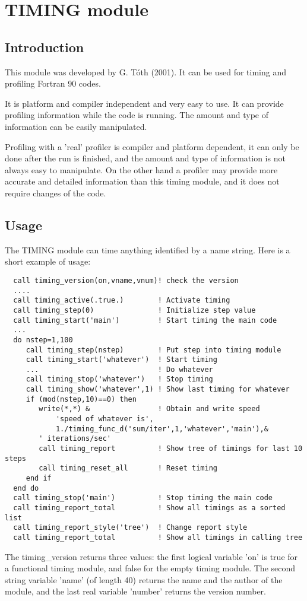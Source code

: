 \documentclass[10pt]{article}
\begin{document}
\section{TIMING module}

\subsection{Introduction}

This module was developed by G. T\'oth (2001).
It can be used for timing and profiling Fortran 90 codes.

It is platform and compiler independent and very easy to use.
It can provide profiling information while the code is running.
The amount and type of information can be easily manipulated.

Profiling with a 'real' profiler is compiler and platform dependent, 
it can only be done after the run is finished, and the amount and
type of information is not always easy to manipulate. On the other hand
a profiler may provide more accurate and detailed information than 
this timing module, and it does not require changes of the code.

\subsection{Usage}

The TIMING module can time anything identified by a name string.
Here is a short example of usage:
{\footnotesize
\begin{verbatim}
  call timing_version(on,vname,vnum)! check the version
  ....
  call timing_active(.true.)        ! Activate timing
  call timing_step(0)               ! Initialize step value
  call timing_start('main')         ! Start timing the main code
  ...
  do nstep=1,100
     call timing_step(nstep)        ! Put step into timing module
     call timing_start('whatever')  ! Start timing
     ...                            ! Do whatever
     call timing_stop('whatever')   ! Stop timing
     call timing_show('whatever',1) ! Show last timing for whatever 
     if (mod(nstep,10)==0) then
        write(*,*) &                ! Obtain and write speed
            'speed of whatever is',
            1./timing_func_d('sum/iter',1,'whatever','main'),&
	    ' iterations/sec'
        call timing_report          ! Show tree of timings for last 10 steps
        call timing_reset_all       ! Reset timing
     end if
  end do
  call timing_stop('main')          ! Stop timing the main code
  call timing_report_total          ! Show all timings as a sorted list
  call timing_report_style('tree')  ! Change report style
  call timing_report_total          ! Show all timings in calling tree
\end{verbatim}
}
The timing\_version returns three values: the first logical variable
'on' is true for a functional timing module, and false for
the empty timing module. The second string variable 'name' (of length 40)
returns the name and the author of the module, and the last real variable
'number' returns the version number. 
\end{document}
